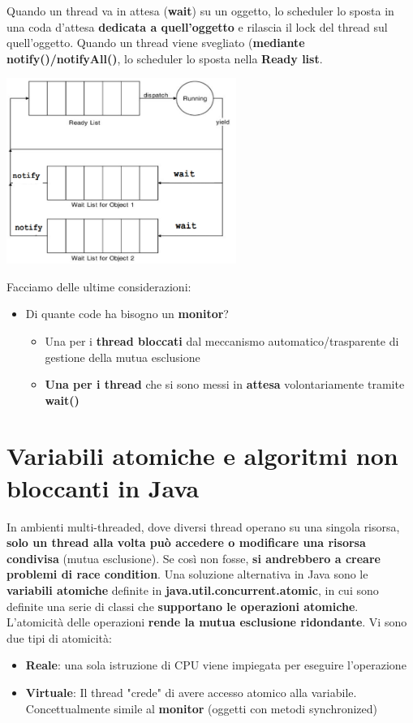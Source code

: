 \documentclass[12pt]{article}
\begin{document}
Quando un thread va in attesa (\textbf{wait}) su un oggetto, lo scheduler lo sposta in una coda d'attesa \textbf{dedicata a quell'oggetto} e rilascia il lock del thread sul quell'oggetto. Quando un thread viene svegliato (\textbf{mediante notify()/notifyAll()}, lo scheduler lo sposta nella \textbf{Ready list}.
\begin{center}
    \includegraphics[width = 7.50cm]{Images/86.png}
\end{center}
Facciamo delle ultime considerazioni:
\begin{itemize}
    \item Di quante code ha bisogno un \textbf{monitor}?
          \begin{itemize}
              \item Una per i \textbf{thread bloccati} dal meccanismo automatico/trasparente di gestione della mutua esclusione
              \item \textbf{Una per i thread} che si sono messi in \textbf{attesa} volontariamente tramite \textbf{wait()}
          \end{itemize}
\end{itemize}
\section{Variabili atomiche e algoritmi non bloccanti in Java}
In ambienti multi-threaded, dove diversi thread operano su una singola risorsa, \textbf{solo un thread alla volta può accedere o modificare una risorsa condivisa} (mutua esclusione). Se così non fosse, \textbf{si andrebbero a creare problemi di race condition}. Una soluzione alternativa in Java sono le \textbf{variabili atomiche} definite in \textbf{java.util.concurrent.atomic}, in cui sono definite una serie di classi che \textbf{supportano le operazioni atomiche}. L'atomicità delle operazioni \textbf{rende la mutua esclusione ridondante}. Vi sono due tipi di atomicità:
\begin{itemize}
    \item \textbf{Reale}: una sola istruzione di CPU viene impiegata per eseguire l'operazione
    \item \textbf{Virtuale}: Il thread "crede" di avere accesso atomico alla variabile. Concettualmente simile al \textbf{monitor} (oggetti con metodi synchronized)
\end{itemize}
\end{document}
